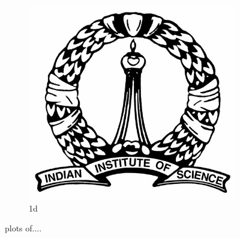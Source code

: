 \documentclass[10pt,a4paper]{article}
\begin{document}
\begin{figure}
\begin{subfigure}{.48\textwidth}
\centering
\includegraphics[width=.8\linewidth]{IISc_logo.jpg}
\caption{1d}
\label{fig:sfig4}
\end{subfigure}

\caption{plots of....}
\label{fig:fig}
\end{figure}
\end{document}
